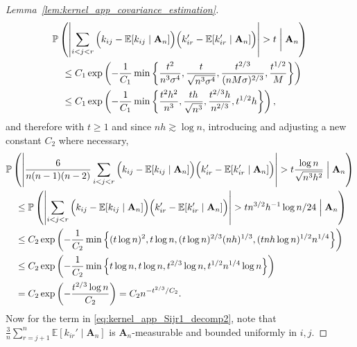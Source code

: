\documentclass[11pt,lof]{puthesis}
\renewcommand{\P}{\ensuremath{\mathbb{P}}}
\newcommand{\E}{\ensuremath{\mathbb{E}}}
\newcommand{\bA}{\ensuremath{\mathbf{A}}}
\theoremstyle{break}
\theoremstyle{proof}
\newtheorem{proof}{Proof}
\begin{document}
\begin{proof}[Lemma~\ref{lem:kernel_app_covariance_estimation}]
\begin{align*}
    &\P\left(
      \left|
      \sum_{i<j<r}
      \Big(
        k_{i j}
        - \E[k_{i j} \mid \bA_n]
      \Big)
      \Big(
        k_{i r}'
        - \E[k_{i r}' \mid \bA_n]
      \Big)
      \right|
      > t
      \biggm\vert \bA_n
    \right) \\
    &\quad\leq
    C_1 \exp\left(
      -\frac{1}{C_1}
      \min \left\{
        \frac{t^2}{n^3 \sigma^4},
        \frac{t}{\sqrt{n^3 \sigma^4}},
        \frac{t^{2/3}}{(n M \sigma)^{2/3}},
        \frac{t^{1/2}}{M}
      \right\}
    \right) \\
    &\quad\leq
    C_1 \exp\left(
      -\frac{1}{C_1}
      \min \left\{
        \frac{t^2 h^2}{n^3},
        \frac{t h}{\sqrt{n^3}},
        \frac{t^{2/3} h}{n^{2/3}},
        t^{1/2} h
      \right\}
    \right),
  \end{align*}
  and therefore
  with $t \geq 1$
  and since
  $n h \gtrsim \log n$,
  introducing and adjusting a new
  constant $C_2$ where necessary,
  \begin{align*}
    &\P\left(
      \left|
      \frac{6}{n(n-1)(n-2)}
      \sum_{i<j<r}
      \Big(
        k_{i j}
        - \E[k_{i j} \mid \bA_n]
      \Big)
      \Big(
        k_{i r}'
        - \E[k_{i r}' \mid \bA_n]
      \Big)
      \right|
      > t
      \frac{\log n}{\sqrt{n^3 h^2}}
      \Bigm\vert \bA_n
    \right) \\
    &\quad\leq
    \P\left(
      \left|
      \sum_{i<j<r}
      \Big(
        k_{i j}
        - \E[k_{i j} \mid \bA_n]
      \Big)
      \Big(
        k_{i r}'
        - \E[k_{i r}' \mid \bA_n]
      \Big)
      \right|
      > t
      n^{3/2} h^{-1} \log n / 24
      \Bigm\vert \bA_n
    \right) \\
    &\quad\leq
    C_2 \exp\left(
      -\frac{1}{C_2}
      \min \left\{
        (t \log n)^2,
        t \log n,
        (t \log n)^{2/3} (n h)^{1/3},
        (t n h \log n)^{1/2} n^{1/4}
      \right\}
    \right) \\
    &\quad\leq
    C_2 \exp\left(
      -\frac{1}{C_2}
      \min \left\{
        t \log n,
        t \log n,
        t^{2/3} \log n,
        t^{1/2} n^{1/4} \log n
      \right\}
    \right) \\
    &\quad=
    C_2 \exp\left(
      -\frac{t^{2/3} \log n}{C_2}
    \right)
    =
    C_2
    n^{-t^{2/3} / C_2}.
  \end{align*}
  Now for the term
  in \eqref{eq:kernel_app_Sijr1_decomp2},
  note that
  $\frac{3}{n} \sum_{r=j+1}^n \E[k_{i r}' \mid \bA_n]$
  is $\bA_n$-measurable and bounded uniformly in $i,j$.

\end{proof}
\end{document}
